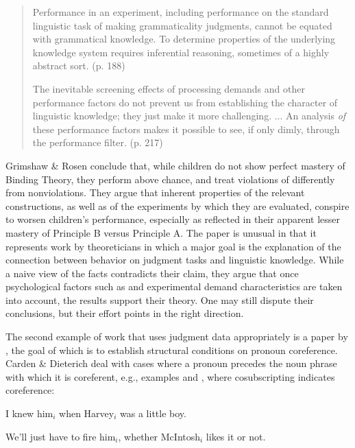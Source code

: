 \begin{quote}
Performance in an experiment, including performance on the standard linguistic task of making grammaticality judgments, cannot be equated with grammatical knowledge. To determine properties of the underlying knowledge system requires inferential reasoning, sometimes of a highly abstract sort. (p. 188)

The inevitable screening effects of processing demands and other performance factors do not prevent us from establishing the character of linguistic knowledge; they just make it more challenging. ... An analysis \textit{of} these performance factors makes it possible to see, if only
dimly, through the performance filter. (p. 217)
\end{quote}

Grimshaw \& Rosen conclude that, while children do not show perfect mastery of Binding Theory, they perform above chance, and treat violations of  differently from nonviolations. They argue that inherent properties of the relevant constructions, as well as of the experiments by which they are evaluated, conspire to worsen children's performance, especially as reflected in their apparent lesser mastery of Principle B versus Principle A. The paper is unusual in that it represents work by theoreticians in which a major goal is the explanation of the connection between behavior on judgment tasks and linguistic knowledge. While a naive view of the facts contradicts their claim, they argue that once psychological factors such as  and experimental demand characteristics are taken into account, the results support their theory. One may still dispute their conclusions, but their effort points in the right direction.



The second example of work that uses judgment data appropriately is a paper by \citet{CardenEtAl1981}, the goal of which is to establish structural conditions on pronoun coreference. Carden \& Dieterich deal with cases where a pronoun precedes the noun phrase with which it is coreferent, e.g., examples  and , where cosubscripting indicates coreference:


\ea\label{ex:1:1}
I knew him$_i$ when Harvey$_i$ was a little boy.
\z


\ea\label{ex:1:2}
 We'll just have to fire him$_i$, whether McIntosh$_i$ likes it or not.
\z

